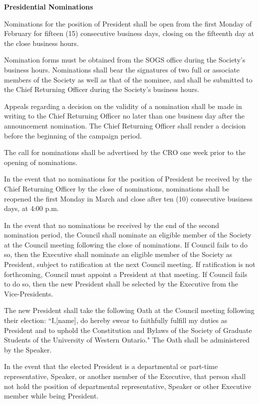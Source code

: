 \begin{longenum}[label*=\arabic*., align=left]
\begin{longenum}[label*=\arabic*., align=left]
 \end{longenum}
 \item \textbf{Presidential Nominations}
 \begin{longenum}[label*=\arabic*., align=left]
  \item  Nominations for the position of President shall be open from the first Monday of February for fifteen (15) consecutive business days, closing on the fifteenth day at the close business hours. 
  \item  Nomination forms must be obtained from the SOGS office during the Society's business hours. Nominations shall bear the signatures of two full or associate members of the Society as well as that of  the nominee, and shall be submitted to the Chief Returning Officer during the Society's business hours.
  \item Appeals regarding a decision on the validity of a nomination shall be made in writing to the Chief Returning Officer no later than one business day after the announcement nomination. The Chief Returning Officer shall render a decision before the beginning of the campaign period.
  \item The call for nominations shall be advertised by the CRO one week prior to the opening of nominations.
  \item In the event that no nominations for the position of President be received by the Chief Returning Officer by the close of nominations, nominations shall be reopened the first Monday in March and close after ten (10) consecutive business days, at 4:00 p.m.
  \item In the event that no nominations be received by the end of the second nomination period, the Council shall nominate an eligible member of the Society at the Council meeting following the close of nominations. If Council fails to do so, then the Executive shall nominate an eligible member of the Society as President, subject to ratification at the next Council meeting. If ratification is not forthcoming, Council must appoint a President at that meeting. If Council fails to do so, then the new President shall be selected by the Executive from the Vice-Presidents.
  \item The new President shall take the following Oath at the Council meeting following their election: ``I,[name], do hereby swear to faithfully fulfill my duties as President and to uphold the Constitution and Bylaws of the Society of Graduate Students of the University of Western Ontario." The Oath shall be administered by the Speaker.
  \item In the event that the elected President is a departmental or part-time representative, Speaker, or another member of the Executive, that person shall not hold the position of departmental representative, Speaker or other Executive member while being President.

\end{longenum}
\end{longenum}
